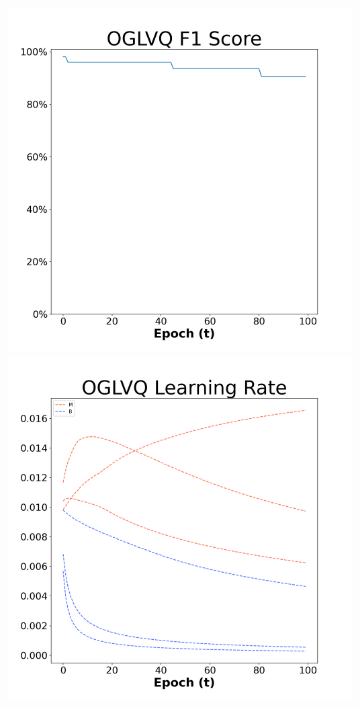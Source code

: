 \begin{figure}[H]
    \centering %
\begin{subfigure}{0.3\textwidth}
  \includegraphics[width=\linewidth]{images/exper2/breast/OGLVQ_0.01_f1.png}
    \includegraphics[width=\linewidth]{images/exper2/breast/OGLVQ_0.01_lr.png}

\end{subfigure}
\end{figure}

